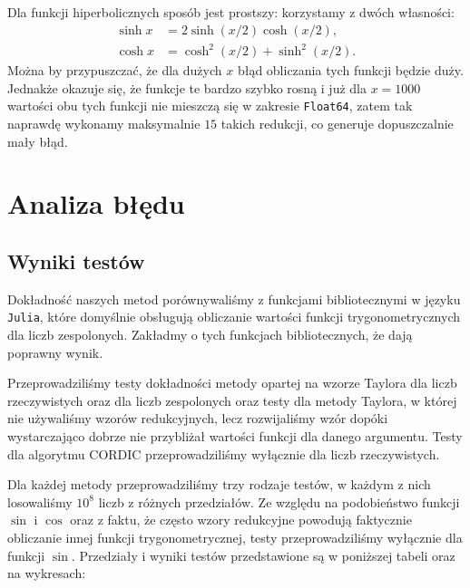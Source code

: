 \documentclass{mwart}
\theoremstyle{remark}
\theoremstyle{definition}
\theoremstyle{definition}
\begin{document}
Dla funkcji hiperbolicznych sposób jest prostszy: korzystamy z dwóch własności:
\begin{align*}
  \sinh x & = 2\sinh(x/2)\cosh(x/2),       \\
  \cosh x & = \cosh^2(x/2) + \sinh^2(x/2).
\end{align*}
Można by przypuszczać, że dla dużych $x$ błąd obliczania tych funkcji będzie duży. Jednakże okazuje się, że funkcje te bardzo szybko rosną i już dla $x = 1000$ wartości obu tych funkcji nie mieszczą się w zakresie \texttt{Float64}, zatem tak naprawdę wykonamy maksymalnie $15$ takich redukcji, co generuje dopuszczalnie mały błąd.

\section{Analiza błędu}

\subsection{Wyniki testów}
Dokładność naszych metod porównywaliśmy z funkcjami bibliotecznymi w języku \texttt{Julia}, które domyślnie obsługują obliczanie wartości funkcji trygonometrycznych dla liczb zespolonych. Zakładmy o tych funkcjach bibliotecznych, że dają poprawny wynik.

Przeprowadziliśmy testy dokładności metody opartej na wzorze Taylora dla liczb rzeczywistych oraz dla liczb zespolonych oraz testy dla metody Taylora, w której nie używaliśmy wzorów redukcyjnych, lecz rozwijaliśmy wzór dopóki wystarczająco dobrze nie przybliżał wartości funkcji dla danego argumentu. Testy dla algorytmu CORDIC przeprowadziliśmy wyłącznie dla liczb rzeczywistych. 

Dla każdej metody przeprowadziliśmy trzy rodzaje testów, w każdym z nich losowaliśmy $10^8$ liczb z różnych przedziałów. Ze względu na podobieństwo funkcji $\sin$ i $\cos$ oraz z faktu, że często wzory redukcyjne powodują faktycznie obliczanie innej funkcji trygonometrycznej, testy przeprowadziliśmy wyłącznie dla funkcji $\sin$. Przedziały i wyniki testów przedstawione są w poniższej tabeli oraz na wykresach:
\end{document}
